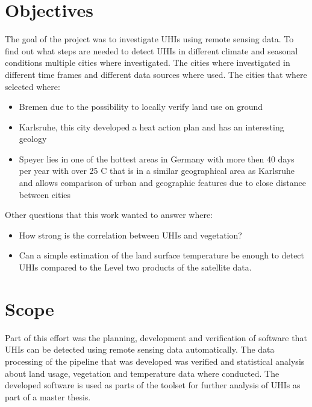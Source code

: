 \documentclass[a4paper, english]{article}
\begin{document}
\section{Objectives}
The goal of the project was to investigate \acp{UHI} using remote sensing data. 
To find out what steps are needed to detect \acp{UHI} in different climate and seasonal conditions multiple cities where investigated. 
The cities where investigated in different time frames and different data sources where used.  
The cities that where selected where: 
\begin{itemize}
    \item Bremen  due to the possibility to locally verify land use on ground
    \item Karlsruhe, this city developed a heat action plan and has an interesting geology 
    \item Speyer lies in one of the hottest areas in Germany with more then 40 days per year with over 25 \textdegree C that is in a similar geographical area as Karlsruhe and allows comparison of urban and geographic features due to close distance between cities
\end{itemize}
%
%
Other questions that this work wanted to answer where: \\
\begin{itemize}
  \item How strong is the correlation between \acp{UHI} and vegetation? 
  \item Can a simple estimation of the land surface temperature be enough to detect \acp{UHI} compared to the Level two products of the satellite data. 
\end{itemize}
\section{Scope}
Part of this effort was the planning, development and verification of software that \acp{UHI} can be detected using remote sensing data automatically. 
The data processing of the pipeline that was developed was verified and statistical analysis about land usage, vegetation and temperature data where conducted. 
The developed software is used as parts of the toolset for further analysis of \acp{UHI} as part of a master thesis. 
\end{document}
